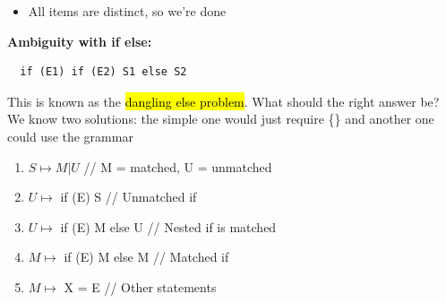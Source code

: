 \documentclass[10pt,landscape]{article}
\newcommand{\yellow}[1]{\sethlcolor{yellow} \hl{#1}}
\begin{document}
\begin{multicols}{3}
\begin{itemize}
  \item All items are distinct, so we’re done
\end{itemize}
\textbf{Ambiguity with if else:} \begin{verbatim}
  if (E1) if (E2) S1 else S2
\end{verbatim}
This is known as the \yellow{dangling else problem}. What should the right answer be?
We know two solutions: the simple one would just require \{\} and another one could use the grammar
\begin{enumerate}
  \item $S \mapsto M | U$   // M = matched, U = unmatched
  \item $U \mapsto$ if (E) S   // Unmatched if
  \item $U \mapsto$ if (E) M else U  // Nested if is matched
  \item $M \mapsto$ if (E) M else M // Matched if
  \item $M \mapsto$ X = E  // Other statements
\end{enumerate}

\end{multicols}
\end{document}
